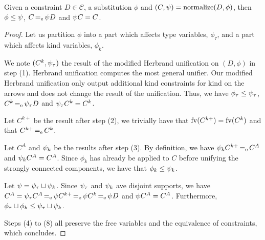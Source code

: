 \begin{lemma}
  \label{lemma:normalform}
  Given a constraint $D\in\mathcal C$, a substitution $\phi$ and
  $(C,\mathrm{\psi}) = \operatorname{normalize}(D,\phi)$,
  then $\phi\leq\mathrm{\psi}$,
  $C \operatorname{=_e} \mathrm{\psi} D$ and
  $\mathrm{\psi} C = C$.
\end{lemma}
\begin{proof}
  Let us partition $\phi$ into a part which affects type variables,
  $\phi_\tau$, and a part which affects kind variables, $\phi_k$.
  
  We note $(C^k,\mathrm{\psi}_\tau)$ the result of
  the modified Herbrand unification on $(D,\phi)$ in step (1).
  Herbrand unification computes the most general
  unifier. Our modified Herbrand unification only output additional
  kind constraints for kind on the arrows and does not change
  the result of the unification. Thus, we have
  $\phi_\tau\leq\mathrm{\psi}_\tau$,
  $C^k \operatorname{=_e} \mathrm{\psi}_\tau D$ and
  $\mathrm{\psi}_\tau C^k = C^k$.
  
  Let $C^{k+}$ be the result after step (2), we trivially have that
  $\operatorname{fv}(C^{k+}) = \operatorname{fv}(C^k)$ and that $C^{k+} \operatorname{=_e} C^k$.

  Let $C^{A}$ and $\mathrm{\psi}_k$ be the results after step (3).
  By definition, we have $\mathrm{\psi}_k C^{k+} \operatorname{=_e} C^{A}$ and
  $\mathrm{\psi}_k C^{A} = C^{A}$. Since $\phi_k$ has already be applied to $C$ before
  unifying the strongly connected components,
  we have that $\phi_k\leq\mathrm{\psi}_k$.

  Let $\mathrm{\psi} = \mathrm{\psi}_\tau \sqcup \mathrm{\psi}_k$. Since $\mathrm{\psi}_\tau$ and $\mathrm{\psi}_k$
  ave disjoint supports,
  we have $C^{A} = \mathrm{\psi}_\tau C^{A} \operatorname{=_e} \mathrm{\psi} C^{k+} \operatorname{=_e} \mathrm{\psi} C^{k} \operatorname{=_e} \mathrm{\psi} D$
  and $\mathrm{\psi} C^{A} = C^{A}$.
  Furthermore, $\phi_\tau \sqcup \phi_k \leq \mathrm{\psi}_\tau \sqcup \mathrm{\psi}_k$.
  
  Steps (4) to (8) all preserve the free variables and the equivalence
  of constraints, which concludes.
\end{proof}

